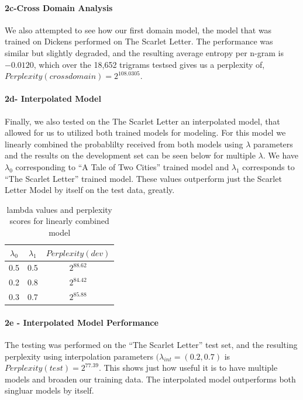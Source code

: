 \documentclass[paper=a4, fontsize=11pt]{scrartcl} %
\begin{document}
\paragraph{2c-Cross Domain Analysis}
We also attempted to see how our first domain model, the model that was trained on Dickens performed on The Scarlet Letter.  The performance was similar but slightly degraded, and the resulting average entropy per n-gram is $-0.0120$, which over the 18,652 trigrams testsed gives us  a perplexity of, $Perplexity(crossdomain) = 2^{108.0305}$.

\paragraph{2d- Interpolated Model}
Finally, we also tested on the The Scarlet Letter an interpolated model, that allowed for us to utilized both trained models for modeling.  For this model we linearly combined the probablilty received from both models using $\lambda$ parameters and the results on the development set can be seen below for multiple $\lambda$.  We have $\lambda_0$ corresponding to ``A Tale of Two Cities'' trained model and $\lambda_1$ corresponds to ``The Scarlet Letter'' trained model.  
These values outperform just the Scarlet Letter Model by itself on the test data, greatly.

\begin{table}
\centering
\label{tab:table2}
\caption{lambda values and perplexity scores for linearly combined model}
\begin{tabular}{|c|c|c|}
\hline
$\lambda_0$ & $\lambda_1$ & $Perplexity(dev)$ \\ \hline \hline
0.5 & 0.5 & $2^{88.62}$ \\ \hline
0.2 & 0.8 & $2^{84.42}$ \\ \hline
0.3 & 0.7 & $2^{85.88}$ \\ \hline
\end{tabular}
\end{table}

\paragraph{2e - Interpolated Model Performance}
The testing was performed on the ``The Scarlet Letter'' test set, and the resulting perplexity using interpolation parameters $(\lambda_{int} = (0.2,0.7)$ is $Perplexity(test) = 2^{77.39}$.  This shows just how useful it is to have multiple models and broaden our training data.  The interpolated model outperforms both singluar models by itself.
\end{document}
